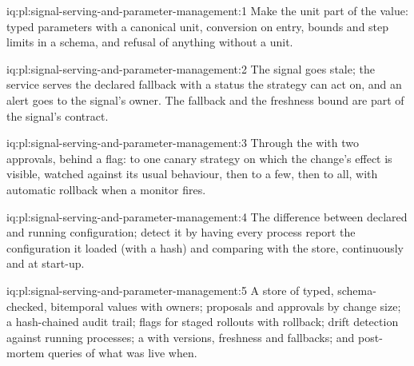\begin{solution}{iq:pl:signal-serving-and-parameter-management:1}
Make the unit part of the value: typed parameters with a canonical unit, conversion on entry, bounds and step limits in a schema, and refusal
of anything without a unit.
\end{solution}

\begin{solution}{iq:pl:signal-serving-and-parameter-management:2}
The signal goes stale; the service serves the declared fallback with a status the strategy can act on, and an alert goes to the signal's owner.
The fallback and the freshness bound are part of the signal's contract.
\end{solution}

\begin{solution}{iq:pl:signal-serving-and-parameter-management:3}
Through the  with two approvals, behind a flag: to one canary strategy on which the change's effect is visible, watched against
its usual behaviour, then to a few, then to all, with automatic rollback when a monitor fires.
\end{solution}

\begin{solution}{iq:pl:signal-serving-and-parameter-management:4}
The difference between declared and running configuration; detect it by having every process report the configuration it loaded (with a
hash) and comparing with the store, continuously and at start-up.
\end{solution}

\begin{solution}{iq:pl:signal-serving-and-parameter-management:5}
A store of typed, schema-checked, bitemporal values with owners; proposals and approvals by change size; a hash-chained audit trail; flags for
staged rollouts with rollback; drift detection against running processes; a  with versions, freshness and fallbacks; and
post-mortem queries of what was live when.
\end{solution}
